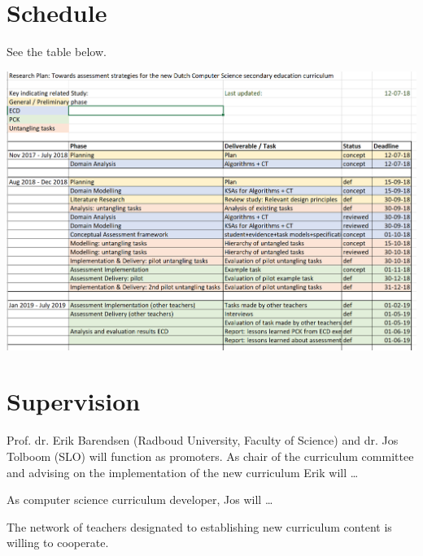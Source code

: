 
\section{Schedule}\label{sec:Schedule}

See the table below.


\includegraphics[scale=0.8]{figures/schedule.png}



\section{Supervision}\label{sec:Supervision}

Prof. dr. Erik Barendsen (Radboud University, Faculty of Science) and dr. Jos Tolboom (SLO) will function as promoters.
As chair of the curriculum committee and advising on the implementation of the new curriculum Erik will \dots

As computer science curriculum developer, Jos will \ldots

The network of teachers designated to establishing new curriculum content is willing to cooperate.
